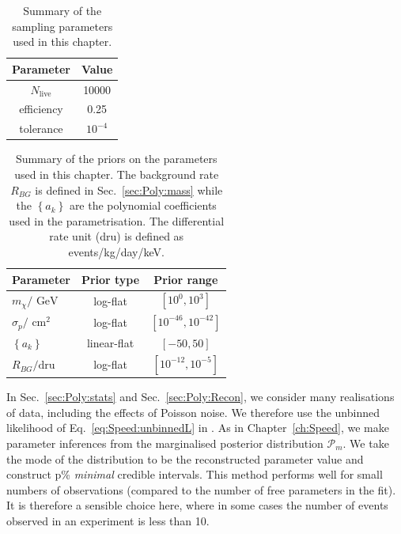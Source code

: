 \begin{table}[t]
  \setlength{\extrarowheight}{2pt}
  \setlength{\tabcolsep}{3pt}
  \begin{center}
	\begin{tabular}{c|c}
        \hline\hline
        Parameter & Value \\
        \hline
	$N_\textrm{live}$ & 10000 \\
	efficiency & 0.25 \\
	tolerance & $10^{-4}$ \\
        \hline\hline
	\end{tabular}
  \end{center}
\caption[Summary of the \multinest sampling parameters used in Chapter \ref{ch:Poly}]{Summary of the \multinest sampling parameters used in this chapter.}
\label{tab:Poly:MultiNest}
\end{table}

\begin{table}[t]
  \setlength{\extrarowheight}{2pt}
  \setlength{\tabcolsep}{3pt}
  \begin{center}
	\begin{tabular}{m{1in}|cc}
        \hline\hline
	Parameter & Prior type & Prior range\\
	\hline
	$m_\chi / \textrm{ GeV}$ &  log-flat & $\left[10^{0}, 10^{3}\right]$\\
	$\sigma_p / \textrm{ cm}^2$ & log-flat & $\left[10^{-46}, 10^{-42}\right]$ \\
	$\left\{a_k\right\}$ & linear-flat & $\left[-50, 50\right]$ \\
        $R_{BG} / \textrm{dru}$ & log-flat & $\left[10^{-12}, 10^{-5}\right]$ \\
        \hline\hline
	\end{tabular}
  \end{center}
\caption[Summary of the priors on the parameters used in Chapter \ref{ch:Poly}]{Summary of the priors on the parameters used in this chapter. The background rate $R_{BG}$ is defined in Sec.~\ref{sec:Poly:mass} while the $\left\{a_k\right\}$ are the polynomial coefficients used in the parametrisation. The differential rate unit (dru) is defined as events/kg/day/keV.}
\label{tab:Poly:priors}
\end{table}


In Sec.~\ref{sec:Poly:stats} and Sec.~\ref{sec:Poly:Recon}, we consider many realisations of data, including the effects of Poisson noise. We therefore use the unbinned likelihood of Eq.~\ref{eq:Speed:unbinnedL} in \multinest. As in Chapter~\ref{ch:Speed}, we make parameter inferences from the marginalised posterior distribution $\mathcal{P}_m$. We take the mode of the distribution to be the reconstructed parameter value and construct p\% \textit{minimal} credible intervals. This method performs well for small numbers of observations (compared to the number of free parameters in the fit). It is therefore a sensible choice here, where in some cases the number of events observed in an experiment is less than 10.

